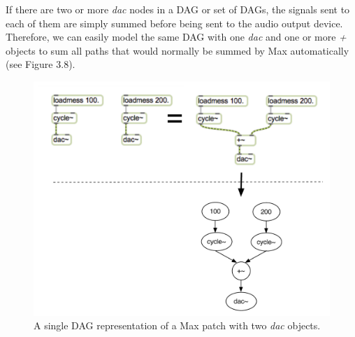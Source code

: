 \documentclass[12pt]{report} 	%
\numberwithin{figure}{chapter}
\numberwithin{table}{chapter}
\numberwithin{equation}{chapter}
\begin{document}
\begin{flushleft}
If there are two or more \textit{dac\texttildelow{}} nodes in a DAG or set of DAGs, the signals sent to each of them are simply summed before being sent to the audio output device. Therefore, we can easily model the same DAG with one \textit{dac\texttildelow{}} and one or more \textit{+\texttildelow{}} objects to sum all paths that would normally be summed by Max automatically (see Figure 3.8). 
\begin{figure}[h!]
\begin{center}
\includegraphics[scale=0.7]{MaxDAGs2DACs}
\caption[A single DAG with two \textit{dac\texttildelow{}} objects]{A single DAG representation of a Max patch with two \textit{dac\texttildelow{}} objects.}
\end{center}
\end{figure}


\end{flushleft}
\end{document}
